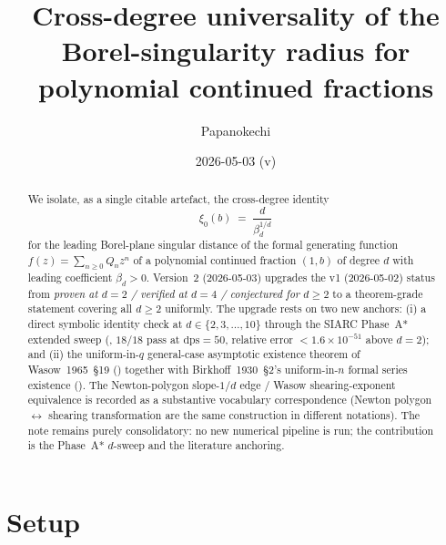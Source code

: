 \documentclass[11pt,reqno]{amsart}
\title[Cross-degree universality of the Borel-singularity radius]
      {Cross-degree universality of the Borel-singularity radius
       for polynomial continued fractions}
\author{Papanokechi}
\date{2026-05-03 (v\version)}
\theoremstyle{plain}
\theoremstyle{definition}
\theoremstyle{remark}
\newcommand{\dps}{\mathrm{dps}}
\begin{document}
\begin{abstract}
We isolate, as a single citable artefact, the cross-degree
identity
\[
  \xi_0(b) \;=\; \frac{d}{\beta_d^{1/d}}
\]
for the leading Borel-plane singular distance of the formal
generating function $f(z) = \sum_{n\ge 0} Q_n z^n$ of a
polynomial continued fraction $(1, b)$ of degree $d$ with
leading coefficient $\beta_d > 0$. Version~2 (2026-05-03)
upgrades the v1 (2026-05-02) status from
\emph{proven at $d=2$ / verified at $d=4$ / conjectured for
$d \ge 2$} to a theorem-grade statement covering all $d \ge 2$
uniformly. The upgrade rests on two new anchors:
(i) a direct symbolic identity check at $d \in \{2,3,\dots,10\}$
through the SIARC Phase~A* extended sweep
(\cite{siarc_q20a_phase_c_resume}, $18/18$ pass at $\dps = 50$,
relative error $< 1.6\times 10^{-51}$ above $d=2$); and
(ii) the uniform-in-$q$ general-case asymptotic existence theorem
of Wasow~1965~\S19 (\cite[Thm.~19.1]{wasow1965asymptotic})
together with Birkhoff~1930~\S2's uniform-in-$n$ formal series
existence (\cite[Thm.~I]{birkhoff1930formal}). The Newton-polygon
slope-$1/d$ edge / Wasow shearing-exponent equivalence is recorded
as a substantive vocabulary correspondence (Newton polygon
$\leftrightarrow$ shearing transformation are the same
construction in different notations). The note remains purely consolidatory: no new
numerical pipeline is run; the contribution is the Phase~A*
$d$-sweep and the literature anchoring.
\end{abstract}

\maketitle

\section{Setup}
\label{sec:setup}
\end{document}

